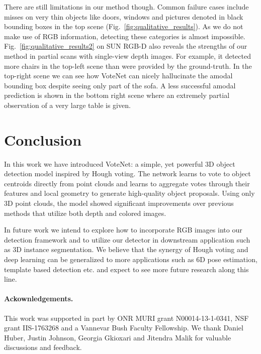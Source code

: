 \documentclass[10pt,twocolumn,letterpaper]{article}
\newcommand\votenet{VoteNet}
\begin{document}
There are still limitations in our method though. Common failure cases include misses on very thin objects like doors, windows and pictures denoted in black bounding boxes in the top scene (Fig.~\ref{fig:qualitative_results}). As we do not make use of RGB information, detecting these categories is almost impossible. Fig.~\ref{fig:qualitative_results2} on SUN RGB-D also reveals the strengths of our method in partial scans with single-view depth images. For example, it detected more chairs in the top-left scene than were provided by the ground-truth. In the top-right scene we can see how \votenet{} can nicely hallucinate the amodal bounding box despite seeing only part of the sofa. A less successful amodal prediction is shown in the bottom right scene where an extremely partial observation of a very large table is given. 
 
\section{Conclusion}
In this work we have introduced \votenet{}: a simple, yet powerful 3D object detection model inspired by Hough voting. The network learns to vote to object centroids directly from point clouds and learns to aggregate votes through their features and local geometry to generate high-quality object proposals. Using only 3D point clouds, the model showed significant improvements over previous methods that utilize both depth and colored images.


In future work we intend to explore how to incorporate RGB images into our detection framework and to utilize our detector in downstream application such as 3D instance segmentation. We believe that the synergy of Hough voting and deep learning can be generalized to more applications such as 6D pose estimation, template based detection etc. and expect to see more future research along this line. 
\paragraph{Ackownledgements.}
This work was supported in part by ONR MURI grant N00014-13-1-0341, NSF grant IIS-1763268 and a Vannevar Bush Faculty Fellowship. We thank Daniel Huber, Justin Johnson, Georgia Gkioxari and Jitendra Malik for valuable discussions and feedback.





{\small


}
\end{document}
